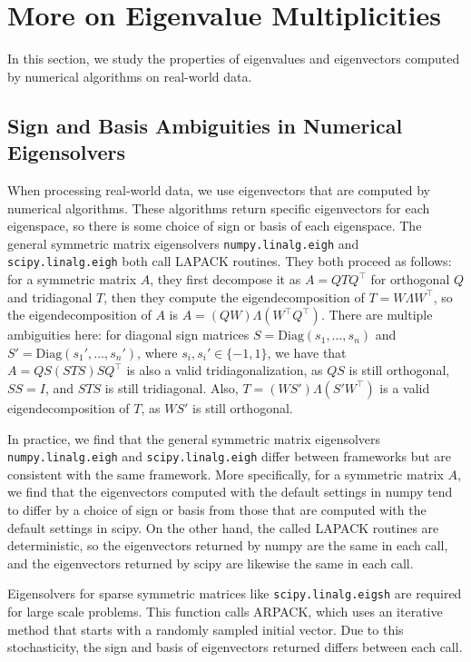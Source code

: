\documentclass{article} \usepackage{iclr2023_conference,times}
\newcommand{\mrm}[1]{\mathrm{#1}}
\begin{document}
\section{More on Eigenvalue Multiplicities}\label{appendix:eig_in_practice}

In this section, we study the properties of eigenvalues and eigenvectors computed by numerical algorithms on real-world data.

\subsection{Sign and Basis Ambiguities in Numerical Eigensolvers}

When processing real-world data, we use eigenvectors that are computed by numerical algorithms. These algorithms return specific eigenvectors for each eigenspace, so there is some choice of sign or basis of each eigenspace. The general symmetric matrix eigensolvers \texttt{numpy.linalg.eigh} and \texttt{scipy.linalg.eigh} both call LAPACK routines. They both proceed as follows: for a symmetric matrix $A$, they first decompose it as $A = QTQ^\top$ for orthogonal $Q$ and tridiagonal $T$, then they compute the eigendecomposition of $T = W\Lambda W^\top$, so the eigendecomposition of $A$ is $A = (QW)\Lambda (W^\top Q^\top)$. There are multiple ambiguities here: for diagonal sign matrices $S = \mrm{Diag}(s_1, \ldots, s_n)$ and $S' = \mrm{Diag}(s_1', \ldots, s_n')$, where $s_i, s_i' \in \{-1, 1\}$, we have that $A = QS(STS)SQ^\top$ is also a valid tridiagonalization, as $QS$ is still orthogonal, $SS = I$, and $STS$ is still tridiagonal. Also, $T = (WS')\Lambda (S'W^\top)$ is a valid eigendecomposition of $T$, as $WS'$ is still orthogonal.

In practice, we find that the general symmetric matrix eigensolvers \texttt{numpy.linalg.eigh} and \texttt{scipy.linalg.eigh} differ between frameworks but are consistent with the same framework. More specifically, for a symmetric matrix $A$, we find that the eigenvectors computed with the default settings in numpy tend to differ by a choice of sign or basis from those that are computed with the default settings in scipy. On the other hand, the called LAPACK routines are deterministic, so the eigenvectors returned by numpy are the same in each call, and the eigenvectors returned by scipy are likewise the same in each call.

Eigensolvers for sparse symmetric matrices like \texttt{scipy.linalg.eigsh} are required for large scale problems. This function calls ARPACK, which uses an iterative method that starts with a randomly sampled initial vector. Due to this stochasticity, the sign and basis of eigenvectors returned differs between each call.
\end{document}
